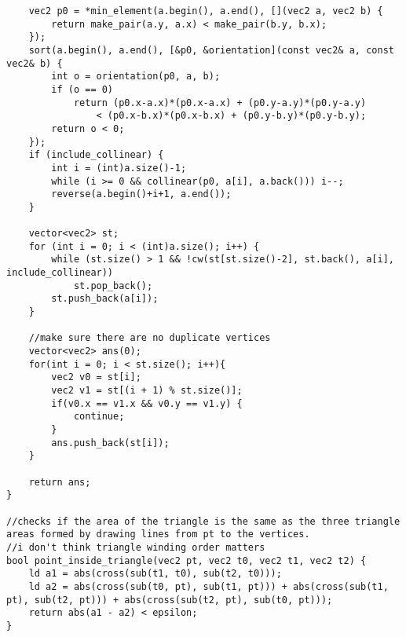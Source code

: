 \documentclass[8pt, headheight=10pt]{scrartcl}
\begin{document}
\begin{multicols*}{3}
\begin{lstlisting}
    vec2 p0 = *min_element(a.begin(), a.end(), [](vec2 a, vec2 b) {
        return make_pair(a.y, a.x) < make_pair(b.y, b.x);
    });
    sort(a.begin(), a.end(), [&p0, &orientation](const vec2& a, const vec2& b) {
        int o = orientation(p0, a, b);
        if (o == 0)
            return (p0.x-a.x)*(p0.x-a.x) + (p0.y-a.y)*(p0.y-a.y)
                < (p0.x-b.x)*(p0.x-b.x) + (p0.y-b.y)*(p0.y-b.y);
        return o < 0;
    });
    if (include_collinear) {
        int i = (int)a.size()-1;
        while (i >= 0 && collinear(p0, a[i], a.back())) i--;
        reverse(a.begin()+i+1, a.end());
    }

    vector<vec2> st;
    for (int i = 0; i < (int)a.size(); i++) {
        while (st.size() > 1 && !cw(st[st.size()-2], st.back(), a[i], include_collinear))
            st.pop_back();
        st.push_back(a[i]);
    }

    //make sure there are no duplicate vertices
    vector<vec2> ans(0);
    for(int i = 0; i < st.size(); i++){
        vec2 v0 = st[i];
        vec2 v1 = st[(i + 1) % st.size()];
        if(v0.x == v1.x && v0.y == v1.y) {
            continue;
        }
        ans.push_back(st[i]);
    }

    return ans;
}

//checks if the area of the triangle is the same as the three triangle areas formed by drawing lines from pt to the vertices. 
//i don't think triangle winding order matters
bool point_inside_triangle(vec2 pt, vec2 t0, vec2 t1, vec2 t2) {
    ld a1 = abs(cross(sub(t1, t0), sub(t2, t0)));
    ld a2 = abs(cross(sub(t0, pt), sub(t1, pt))) + abs(cross(sub(t1, pt), sub(t2, pt))) + abs(cross(sub(t2, pt), sub(t0, pt)));
    return abs(a1 - a2) < epsilon;
}


\end{lstlisting}
\end{multicols*}
\end{document}
